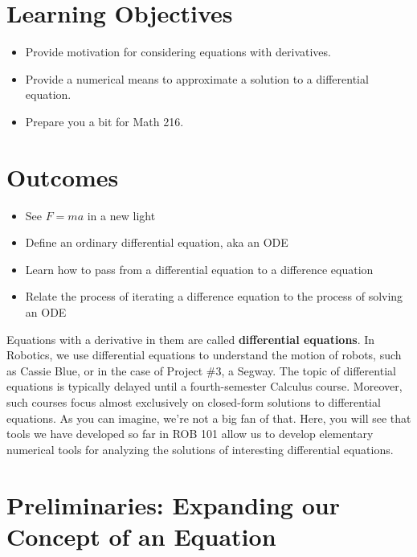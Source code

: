 


\section*{Learning Objectives}
\begin{itemize}
\item Provide motivation for considering equations with derivatives.
\item Provide a numerical means to approximate a solution to a differential equation.
\item Prepare you a bit for Math 216.
\end{itemize}

\section*{Outcomes}
\begin{itemize}
\item See $F=ma$ in a new light
\item Define an ordinary differential equation, aka an ODE
\item Learn how to pass from a differential equation to a difference equation
\item Relate the process of iterating a difference equation to the process of solving an ODE
\end{itemize}


\vspace*{1.5cm}





\newpage

Equations with a derivative in them are called \textbf{differential equations}. In Robotics, we use differential equations to understand the motion of robots, such as Cassie Blue, or in the case of Project \#3, a Segway. The topic of differential equations is typically delayed until a fourth-semester Calculus course. Moreover, such courses focus almost exclusively on closed-form solutions to differential equations. As you can imagine, we're not a big fan of that. Here, you will see that tools we have developed so far in ROB 101 allow us to develop elementary numerical tools for analyzing the solutions of interesting differential equations.

\section{Preliminaries: Expanding our Concept of an Equation}

